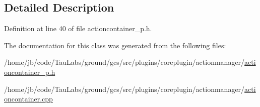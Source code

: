 \subsection{\-Detailed \-Description}


\-Definition at line 40 of file actioncontainer\-\_\-p.\-h.



\-The documentation for this class was generated from the following files\-:\begin{DoxyCompactItemize}
\item 
/home/jb/code/\-Tau\-Labs/ground/gcs/src/plugins/coreplugin/actionmanager/\hyperlink{actioncontainer__p_8h}{actioncontainer\-\_\-p.\-h}\item 
/home/jb/code/\-Tau\-Labs/ground/gcs/src/plugins/coreplugin/actionmanager/\hyperlink{actioncontainer_8cpp}{actioncontainer.\-cpp}\end{DoxyCompactItemize}
